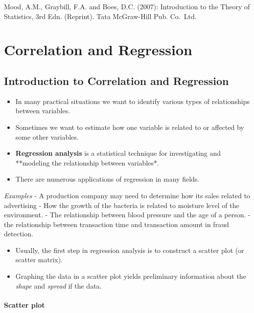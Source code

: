 \documentclass[]{book}
\providecommand{\tightlist}{%
  \setlength{\itemsep}{0pt}\setlength{\parskip}{0pt}}
\begin{document}
Mood, A.M., Graybill, F.A. and Boes, D.C. (2007): Introduction to the Theory of Statistics, 3rd Edn. (Reprint). Tata McGraw-Hill Pub. Co.~Ltd.

\hypertarget{correlation-and-regression}{%
\chapter{Correlation and Regression}\label{correlation-and-regression}}

\hypertarget{introduction-to-correlation-and-regression}{%
\section{Introduction to Correlation and Regression}\label{introduction-to-correlation-and-regression}}

\begin{itemize}
\tightlist
\item
  In many practical situations we want to identify various types of relationships between variables.
\item
  Sometimes we want to estimate how one variable is related to or affected by some other variables.
\item
  \textbf{Regression analysis} is a statistical technique for investigating and **modeling the relationship between variables*.
\item
  There are numerous applications of regression in many fields.
\end{itemize}

\emph{Examples}
- A production company may need to determine how its sales related to advertising
- How the growth of the bacteria is related to moisture level of the environment.
- The relationship between blood pressure and the age of a person.
- the relationship between transaction time and transaction amount in fraud detection.

\begin{itemize}
\tightlist
\item
  Usually, the first step in regression analysis is to construct a scatter plot (or scatter matrix).
\item
  Graphing the data in a scatter plot yields preliminary information about the \emph{shape} and \emph{spread} if the data.
\end{itemize}

\hypertarget{scatter-plot-1}{%
\subsubsection{Scatter plot}\label{scatter-plot-1}}
\end{document}
